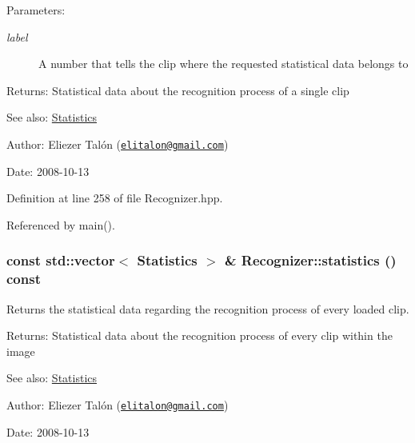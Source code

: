 \begin{Desc}
\item[Parameters:]
\begin{description}
\item[{\em label}]A number that tells the clip where the requested statistical data belongs to\end{description}
\end{Desc}
\begin{Desc}
\item[Returns:]Statistical data about the recognition process of a single clip\end{Desc}
\begin{Desc}
\item[See also:]\hyperlink{class_statistics}{Statistics}\end{Desc}
\begin{Desc}
\item[Author:]Eliezer Talón (\href{mailto:elitalon@gmail.com}{\tt elitalon@gmail.com}) \end{Desc}
\begin{Desc}
\item[Date:]2008-10-13 \end{Desc}


Definition at line 258 of file Recognizer.hpp.

Referenced by main().\hypertarget{class_recognizer_8b38356d2741969e67cd6b4f507897ba}{
\subsubsection[statistics]{\setlength{\rightskip}{0pt plus 5cm}const std::vector$<$ {\bf Statistics} $>$ \& Recognizer::statistics () const}}
\label{class_recognizer_8b38356d2741969e67cd6b4f507897ba}


Returns the statistical data regarding the recognition process of every loaded clip. 

\begin{Desc}
\item[Returns:]Statistical data about the recognition process of every clip within the image\end{Desc}
\begin{Desc}
\item[See also:]\hyperlink{class_statistics}{Statistics}\end{Desc}
\begin{Desc}
\item[Author:]Eliezer Talón (\href{mailto:elitalon@gmail.com}{\tt elitalon@gmail.com}) \end{Desc}
\begin{Desc}
\item[Date:]2008-10-13 \end{Desc}


